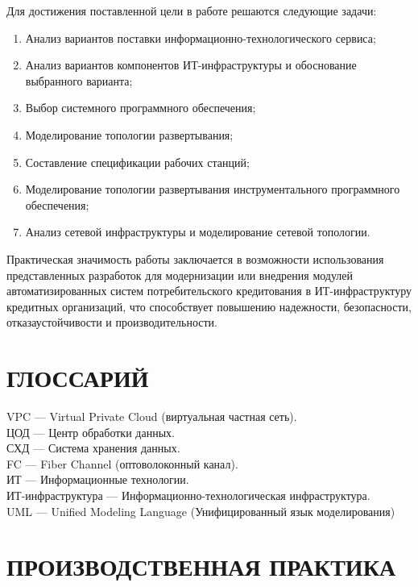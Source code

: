 \documentclass[14pt, a4paper]{extarticle}
\begin{document}
Для достижения поставленной цели в работе решаются следующие задачи:

\begin{enumerate}
  \item Анализ вариантов поставки информационно-технологического сервиса;
  \item Анализ вариантов компонентов ИТ-инфраструктуры и обоснование выбранного варианта;
  \item Выбор системного программного обеспечения;
  \item Моделирование топологии развертывания;
  \item Составление спецификации рабочих станций;
  \item Моделирование топологии развертывания инструментального программного обеспечения;
  \item Анализ сетевой инфраструктуры и моделирование сетевой топологии.
\end{enumerate}

Практическая значимость работы заключается в возможности использования представленных
разработок для модернизации или внедрения модулей автоматизированных систем 
потребительского кредитования в ИТ-инфраструктуру кредитных организаций, что 
способствует повышению надежности, безопасности, отказаустойчивости и производительности.

\section*{ГЛОССАРИЙ}
{}
\begin{raggedright}
  VPC --- Virtual Private Cloud (виртуальная частная сеть). \\
  ЦОД --- Центр обработки данных. \\
  СХД --- Система хранения данных. \\
  FC --- Fiber Channel (оптоволоконный канал). \\
  ИТ --- Информационные технологии. \\
  ИТ-инфраструктура --- Информационно-технологическая инфраструктура. \\
  UML --- Unified Modeling Language (Унифицированный язык моделирования) \\
\end{raggedright}

\section{ПРОИЗВОДСТВЕННАЯ ПРАКТИКА}
\end{document}
